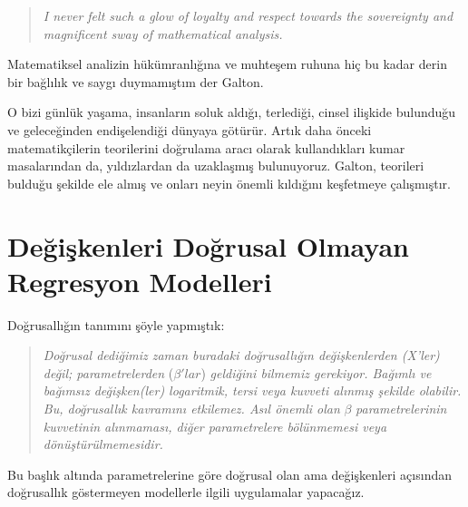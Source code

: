 \documentclass[
]{book}
\newenvironment{Shaded}{\begin{snugshade}}{\end{snugshade}}
\newcommand{\DataTypeTok}[1]{\textcolor[rgb]{0.13,0.29,0.53}{#1}}
\newcommand{\FloatTok}[1]{\textcolor[rgb]{0.00,0.00,0.81}{#1}}
\newcommand{\KeywordTok}[1]{\textcolor[rgb]{0.13,0.29,0.53}{\textbf{#1}}}
\newcommand{\NormalTok}[1]{#1}
\newcommand{\StringTok}[1]{\textcolor[rgb]{0.31,0.60,0.02}{#1}}
\begin{document}
\begin{quote}
\emph{I never felt such a glow of loyalty and respect towards the sovereignty and magnificent sway of mathematical analysis.}
\end{quote}

Matematiksel analizin hükümranlığına ve muhteşem ruhuna hiç bu kadar derin bir bağlılık ve saygı duymamıştım der Galton.

O bizi günlük yaşama, insanların soluk aldığı, terlediği, cinsel ilişkide bulunduğu ve geleceğinden endişelendiği dünyaya götürür. Artık daha önceki matematikçilerin teorilerini doğrulama aracı olarak kullandıkları kumar masalarından da, yıldızlardan da uzaklaşmış bulunuyoruz. Galton, teorileri bulduğu şekilde ele almış ve onları neyin önemli kıldığını keşfetmeye çalışmıştır.

\hypertarget{deux11fiux15fkenleri-doux11frusal-olmayan-regresyon-modelleri}{%
\chapter{Değişkenleri Doğrusal Olmayan Regresyon Modelleri}\label{deux11fiux15fkenleri-doux11frusal-olmayan-regresyon-modelleri}}

Doğrusallığın tanımını şöyle yapmıştık:

\begin{quote}
\emph{Doğrusal dediğimiz zaman buradaki doğrusallığın değişkenlerden (X'ler) değil; parametrelerden} (\(\beta'lar\)) \emph{geldiğini bilmemiz gerekiyor. Bağımlı ve bağımsız değişken(ler) logaritmik, tersi veya kuvveti alınmış şekilde olabilir. Bu, doğrusallık kavramını etkilemez. Asıl önemli olan} \(\beta\) \emph{parametrelerinin kuvvetinin alınmaması, diğer parametrelere bölünmemesi veya dönüştürülmemesidir.}
\end{quote}

Bu başlık altında parametrelerine göre doğrusal olan ama değişkenleri açısından doğrusallık göstermeyen modellerle ilgili uygulamalar yapacağız.

\begin{Shaded}
\end{Shaded}
\end{document}
